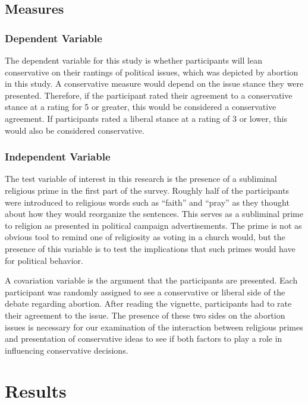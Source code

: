\documentclass[letterpaper,man,natbib,noextraspace,12pt]{apa6}  %
\begin{document}
\subsection{Measures}

\subsubsection{Dependent Variable}

The dependent variable for this study is whether participants will lean conservative on their rantings of political issues, which was depicted by abortion in this study. A conservative measure would depend on the issue stance they were presented. Therefore, if the participant rated their agreement to a conservative stance at a rating for 5 or greater, this would be considered a conservative agreement. If participants rated a liberal stance at a rating of 3 or lower, this would also be considered conservative.

\subsubsection{Independent Variable}

The test variable of interest in this research is the presence of a subliminal religious prime in the first part of the survey. Roughly half of the participants were introduced to religious words such as “faith” and “pray” as they thought about how they would reorganize the sentences. This serves as a subliminal prime to religion as presented in political campaign advertisements. The prime is not as obvious tool to remind one of religiosity as voting in a church would, but the presence of this variable is to test the implications that such primes would have for political behavior.

A covariation variable is the argument that the participants are presented. Each participant was randomly assigned to see a conservative or liberal side of the debate regarding abortion. After reading the vignette, participants had to rate their agreement to the issue. The presence of these two sides on the abortion issues is necessary for our examination of the interaction between religious primes and presentation of conservative ideas to see if both factors to play a role in influencing conservative decisions.

\section{Results}
\end{document}
